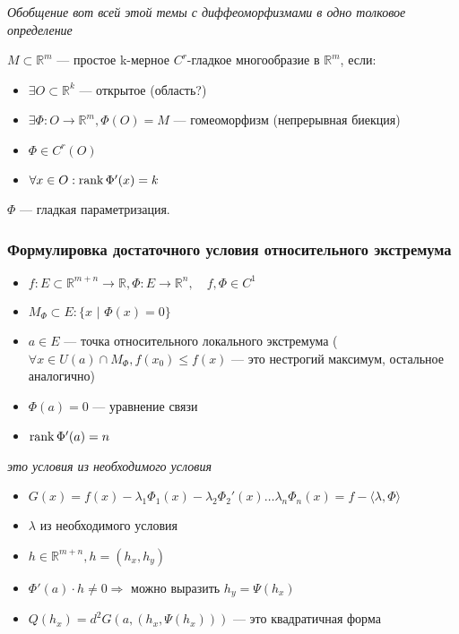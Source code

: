 \documentclass{article}
\def\dbl{\,\,}
\begin{document}
\textit{Обобщение вот всей этой темы с диффеоморфизмами в одно толковое определение}

$M \subset \mathbb{R}^m$ --- простое k-мерное $C^r$-гладкое многообразие в $\mathbb{R}^m$, если:

\begin{itemize}
    \item $\exists O \subset \mathbb{R}^k$ --- открытое (область?)
    \item $\exists \Phi: O \rightarrow \mathbb{R}^m, \Phi(O) = M$ --- гомеоморфизм (непрерывная биекция)
    \item $\Phi \in C^r(O)$
    \item $\forall x \in O: \rank \Phi'(x) = k$
\end{itemize}

$\Phi$ --- гладкая параметризация.

\subsubsection{Формулировка достаточного условия относительного экстремума}
\begin{itemize}
    \item $f: E \subset \mathbb{R}^{m + n} \rightarrow \mathbb{R}, \Phi: E \rightarrow \mathbb{R}^n, \quad f, \Phi \in C^1$
    \item $M_\Phi \subset E: \{x \dbl | \dbl \Phi(x) = 0\}$
    \item $a \in E$ --- точка относительного локального экстремума ($\forall x \in U(a) \cap M_\Phi, f(x_0) \le f(x)$ --- это нестрогий максимум, остальное аналогично)
    \item $\Phi(a) = 0$ --- уравнение связи
    \item $\rank \Phi'(a) = n$
\end{itemize}

\textit{это условия из необходимого условия}

\begin{itemize}
    \item $G(x) = f(x) - \lambda_1\Phi_1(x) - \lambda_2\Phi_2'(x) \ldots \lambda_n\Phi_n(x) = f - \langle \lambda, \Phi \rangle$
    \item $\lambda$ из необходимого условия
    \item $h \in \mathbb{R}^{m + n}, h = (h_x, h_y)$
    \item $\Phi'(a) \cdot h \neq 0 \Rightarrow$ можно выразить $h_y = \Psi(h_x)$
    \item $Q(h_x) = d^2G(a, (h_x, \Psi(h_x)))$ --- это квадратичная форма
\end{itemize}
\end{document}
